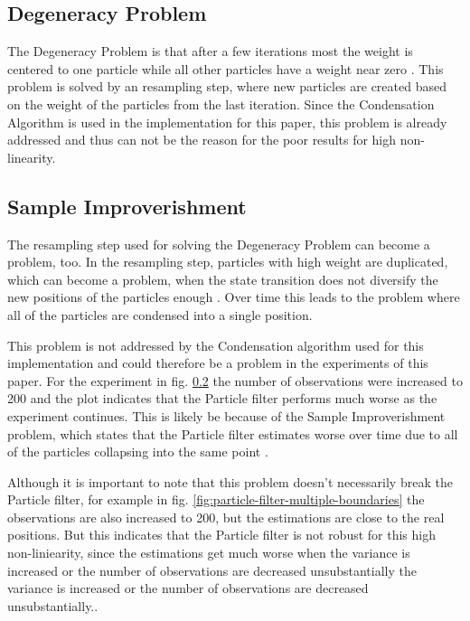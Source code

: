 \documentclass[conference]{IEEEtran}
\begin{document}
\subsection{Degeneracy Problem}
The Degeneracy Problem is that after a few iterations most the weight is centered to one particle while all other particles have a weight near zero \cite{b4}.
This problem is solved by an resampling step, where new particles are created based on the weight of the particles from the last iteration.
Since the Condensation Algorithm \cite{b3} is used in the implementation for this paper, this problem is already addressed and thus can not be the reason for the poor results for high non-linearity. 

\subsection{Sample Improverishment}
The resampling step used for solving the Degeneracy Problem can become a problem, too.
In the resampling step, particles with high weight are duplicated, which can become a problem, when the state transition does not diversify the new positions of the particles enough \cite{b4}. 
Over time this leads to the problem where all of the particles are condensed into a single position.

This problem is not addressed by the Condensation algorithm used for this implementation and could therefore be a problem in the experiments of this paper. 
For the experiment in fig. \ref{} the number of observations were increased to 200 and the plot indicates that the Particle filter performs much worse as the experiment continues.
This is likely be because of the Sample Improverishment problem, which states that the Particle filter estimates worse over time due to all of the particles collapsing into the same point \cite{b4}. 

Although it is important to note that this problem doesn't necessarily break the Particle filter, for example in fig. \ref{fig:particle-filter-multiple-boundaries} the observations are also increased to 200, but the estimations are close to the real positions.
But this indicates that the Particle filter is not robust for this high non-liniearity, since the estimations get much worse when the variance is increased or the number of observations are decreased unsubstantially the variance is increased or the number of observations are decreased unsubstantially.. 
\end{document}
